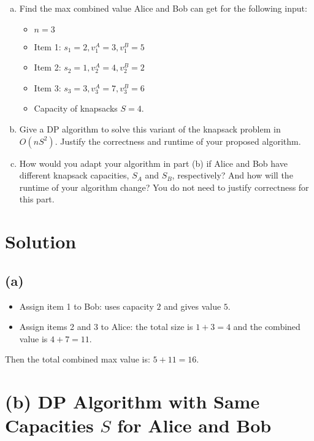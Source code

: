 \documentclass[11pt]{article}
\begin{document}
\begin{tcolorbox}[title={Problem 1 (Knapsack, Take II, 50 pts)}]
        \begin{enumerate}[(a)]
            \item Find the max combined value Alice and Bob can get for the following input:
            \begin{itemize}
                \item \( n = 3 \)
                \item Item 1: \( s_1 = 2, v_1^A = 3, v_1^B = 5 \)
                \item Item 2: \( s_2 = 1, v_2^A = 4, v_2^B = 2 \)
                \item Item 3: \( s_3 = 3, v_3^A = 7, v_3^B = 6 \)
                \item Capacity of knapsacks \(S = 4\).
            \end{itemize} 
            \item Give a DP algorithm to solve this variant of the knapsack problem in $O(nS^2)$. Justify the correctness and runtime of your proposed algorithm. 
            \item How would you adapt your algorithm in part (b) if Alice and Bob have different knapsack capacities, \(S_A\) and \(S_B\), respectively? And how will the runtime of your algorithm change? You do not need to justify correctness for this part.
        \end{enumerate}
    \end{tcolorbox}

    \section*{Solution}

    \subsection*{(a)}
    \begin{itemize}
        \item Assign item 1 to Bob: uses capacity \(2\) and gives value \(5\).
        \item Assign items 2 and 3 to Alice: the total size is \(1+3=4\) and the combined value is \(4+7=11\).
    \end{itemize}
    Then the total combined max value is: \(5 + 11 = 16\).
    
    \section*{(b) DP Algorithm with Same Capacities \(S\) for Alice and Bob}
\end{document}
